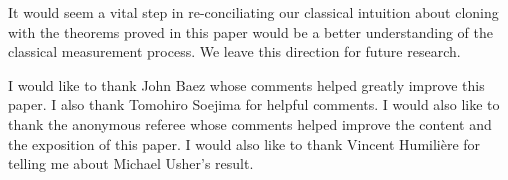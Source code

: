 \documentclass[jmp,amsmath,amssymb]{revtex4-1}
\theoremstyle{plain}
\begin{document}
It would seem a vital step in re-conciliating our classical intuition about cloning with the theorems proved in this paper would be a better understanding of the classical measurement process. We leave this direction for future research.
\begin{acknowledgments}
I would like to thank John Baez whose comments helped greatly improve this paper. I also thank Tomohiro Soejima for helpful comments. I would also like to thank the anonymous referee whose comments helped improve the content and the exposition of this paper. I would also like to thank Vincent Humili\`ere for telling me about Michael Usher's result.
\end{acknowledgments}

\nocite{}
\nocite{*}

\end{document}
